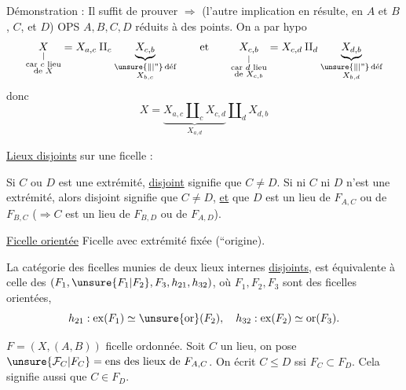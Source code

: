 Démonstration : Il suffit de prouver $\Longrightarrow$
(l'autre implication en résulte, en   $A$ et $B$, $C$, et $D$)
OPS $A,B,C,D$ réduits à des points.
On a par hypo 
\[
\underset{\substack{\vert\\\text{car }c\text{ lieu}\\\text{de }X}}{X}
=
X_{a,c}\amalg_c
\underbrace{X_{c,b}}_{\substack{\unsure{\Vert|\text{''}}\,\text{déf}\\X_{b,c}}}
\qquad\text{et}\qquad
\underset{\substack{\vert\\\text{car }d\text{ lieu}\\\text{de }X_{c,b}}}{X_{c,b}}
=
X_{c,d}\amalg_d
\underbrace{X_{d,b}}_{\substack{\unsure{\Vert|\text{''}}\,\text{déf}\\X_{b,d}}}
\]
donc
\[
X=\underbrace{X_{a,c}\amalg_c X_{c,d}}_{X_{a,d}}\amalg_d X_{d,b}
\]



\uline{Lieux disjoints}  sur une ficelle :

Si $C$ ou $D$ est une extrémité, \uline{disjoint} signifie que $C\ne D$. Si ni $C$ ni $D$ n'est une extrémité, alors disjoint signifie que
 $C\ne D$, \uline{et} que $D$ est un lieu de $F_{A,C}$ ou de $F_{B,C}$ ($\Rightarrow C$ est un lieu de $F_{B,D}$ ou de $F_{A,D}$).

\uline{Ficelle orientée} Ficelle avec extrémité fixée (``origine).

 La catégorie des ficelles  munies de deux lieux internes \uline{disjoints}, est équivalente à celle des   $(F_1,\unsure{F_1|F_2},F_3,h_{21},h_{32})$, où $F_1,F_2,F_3$ sont des ficelles orientées,
\[
h_{21}:\operatorname{ex}(F_1)\simeq\unsure{\operatorname{or}}(F_2),\quad
h_{32}:\operatorname{ex}(F_2)\simeq\operatorname{or}(F_3).
\]

$F=(X,(A,B))$ ficelle ordonnée. Soit $C$ un lieu, on pose $\unsure{\mathcal F_C|F_C}={}\text{ens des lieux de }F_{A,C}$.
On écrit $C\le D$ ssi $F_C\subset F_D$. Cela signifie aussi que $C\in F_D$.


